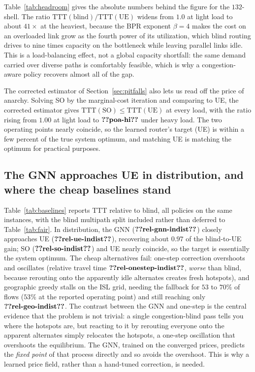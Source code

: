 \documentclass[journal]{IEEEtran}
\newcommand{\TTT}{\mathrm{TTT}}
\begin{document}
Table~\ref{tab:headroom} gives the absolute numbers behind the figure for the
$132$-shell. The ratio $\TTT(\mathrm{blind})/\TTT(\mathrm{UE})$ widens from $1.0$ at
light load to about $41\times$ at the heaviest, because the BPR exponent $\beta{=}4$
makes the cost on an overloaded link grow as the fourth power of its utilization, which
blind routing drives to nine times capacity on the bottleneck while leaving parallel
links idle. This is a load-balancing effect, not a global capacity shortfall:
the same demand carried over diverse paths is comfortably feasible, which is why a
congestion-aware policy recovers almost all of the gap.



The corrected estimator of Section~\ref{sec:pitfalls} also lets us read off the price of
anarchy. Solving SO by the marginal-cost iteration and comparing to UE,
the corrected estimator gives $\TTT(\mathrm{SO})\le\TTT(\mathrm{UE})$ at every load, with the
ratio rising from $1.00$ at light load to $\clm{poa-hi}$ under heavy load. The two operating
points nearly coincide, so the learned router's target (UE) is within a few percent of
the true system optimum, and matching UE is matching the optimum for practical purposes.

\subsection{The GNN approaches UE in distribution, and where the cheap baselines stand}\label{sec:results-baselines}
Table~\ref{tab:baselines} reports TTT relative to blind, all policies on the same instances, with the blind multipath split included rather than deferred to Table~\ref{tab:fair}. In distribution, the GNN ($\clm{rel-gnn-indist}$) closely approaches UE
($\clm{rel-ue-indist}$), recovering about $0.97$ of the blind-to-UE gain; SO ($\clm{rel-so-indist}$) and UE nearly
coincide, so the target is essentially the system optimum. The cheap alternatives fail:
one-step correction overshoots and oscillates (relative travel time $\clm{rel-onestep-indist}$, \emph{worse}
than blind, because rerouting onto the apparently idle alternates creates fresh hotspots),
and geographic greedy stalls on the ISL grid, needing the fallback for $53$ to $70\%$ of
flows ($53\%$ at the reported operating point) and still reaching only $\clm{rel-geo-indist}$. The contrast
between the GNN and one-step is the central evidence that the problem is not trivial: a
single congestion-blind pass tells you where the hotspots are, but reacting to it by
rerouting everyone onto the apparent alternates simply relocates the hotspots, a
one-step oscillation that overshoots the equilibrium. The GNN, trained on the converged
prices, predicts the \emph{fixed point} of that process directly and so avoids the
overshoot. This is why a learned price field, rather than a hand-tuned correction, is
needed.
\end{document}
